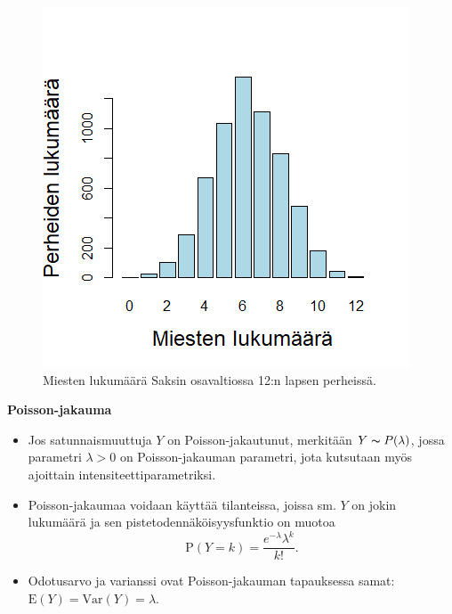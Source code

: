 \documentclass[
]{book}
\begin{document}
\begin{figure}

{\centering \includegraphics[width=7.5\linewidth]{images/Miesten_lkm} 

}

\caption{Miesten lukumäärä Saksin osavaltiossa 12:n lapsen perheissä.}\label{fig:miestenlkm}
\end{figure}

\FloatBarrier

\textbf{Poisson-jakauma}

\begin{itemize}
\item
  Jos satunnaismuuttuja \(Y\) on Poisson-jakautunut, merkitään \(Y \thicksim P(\lambda)\), jossa parametri \(\lambda > 0\) on Poisson-jakauman parametri, jota kutsutaan myös ajoittain intensiteettiparametriksi.
\item
  Poisson-jakaumaa voidaan käyttää tilanteissa, joissa sm. \(Y\) on jokin lukumäärä ja sen pistetodennäköisyysfunktio on muotoa
  \[
  \text{P}(Y=k) = \frac{e^{-\lambda} \lambda^k}{k!}.
  \]
\item
  Odotusarvo ja varianssi ovat Poisson-jakauman tapauksessa samat: \(\text{E}(Y) = \mathrm{Var}(Y) = \lambda\).
\end{itemize}
\end{document}
